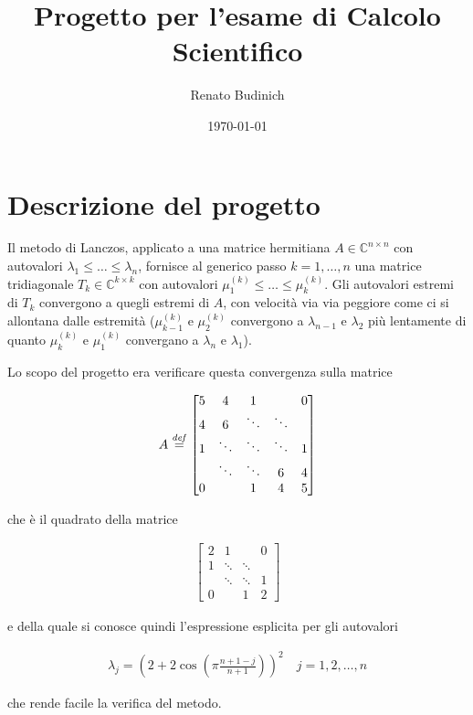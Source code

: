 \documentclass[11pt]{article}
\author{Renato Budinich}
\date{\today}
\title{Progetto per l'esame di Calcolo Scientifico}
\numberwithin{equation}{subsection}
\theoremstyle{connome}
\theoremstyle{connomesenzanumero}
\theoremstyle{connome+}
\theoremstyle{connomesenzanumero+}
\newcommand{\defi}{\ensuremath{\stackrel{\mbox{\scriptsize{\textit{def}}}}{=}}}
\begin{document}
\maketitle
\section{Descrizione del progetto}
\label{sec-1}
Il metodo di Lanczos, applicato a una matrice hermitiana $A \in \mathbb{C}^{n\times n}$ con autovalori $\lambda_1\leq \ldots \leq \lambda_n$, fornisce al generico passo $k=1, \ldots, n$ una matrice tridiagonale $T_k \in \mathbb{C}^{k \times k}$ con autovalori $\mu_1^{(k)} \leq \ldots \leq \mu_k^{(k)}$. Gli autovalori estremi di $T_k$ convergono a quegli estremi di $A$, con velocità via via peggiore come ci si allontana dalle estremità ($\mu_{k-1}^{(k)}$ e $\mu_2^{(k)}$ convergono a $\lambda_{n-1}$ e $\lambda_2$ più lentamente di quanto $\mu_k^{(k)}$ e $\mu_1^{(k)}$ convergano a $\lambda_n$ e $\lambda_1$).

Lo scopo del progetto era verificare questa convergenza sulla matrice 

\begin{align*}
A \defi
\begin{bmatrix}
5 & 4 & 1 & & 0\\
4 & 6 & \ddots & \ddots & \\
1 & \ddots & \ddots & \ddots & 1\\
& \ddots & \ddots & 6 & 4  \\
0 & & 1 & 4 & 5
\end{bmatrix}
\end{align*}

che è il quadrato della matrice

\begin{align*}
\begin{bmatrix}
2 & 1 & & 0\\
1 & \ddots & \ddots & \\
& \ddots & \ddots & 1 \\
0 & & 1 & 2
\end{bmatrix}
\end{align*}

e della quale si conosce quindi l'espressione esplicita per gli autovalori

\begin{align}
\label{lambda}
\lambda_j = (2 + 2 \cos(\pi \frac{n+1-j}{n+1}))^2 \quad j=1,2, \ldots, n
\end{align}

che rende facile la verifica del metodo.
\end{document}
